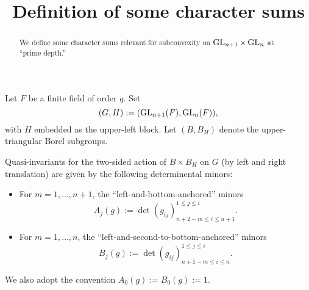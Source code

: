 \documentclass[reqno]{amsart} 
\begin{document}
\title{Definition of some character sums}

\begin{abstract}
  We define some character sums relevant for subconvexity on $\operatorname{GL}_{n+1} \times \operatorname{GL}_n$ at ``prime depth.''
\end{abstract}

\maketitle

Let $F$ be a finite field of order $q$.  Set
\begin{equation*}
  (G,H) := (\operatorname{GL}_{n+1}(F), \operatorname{GL}_n(F)),
\end{equation*}
with $H$ embedded as the upper-left block.  Let $(B, B_H)$ denote the upper-triangular Borel subgroups.

Quasi-invariants for the two-sided action of $B \times B_H$ on $G$ (by left and right translation) are given by the following determinental minors:
\begin{itemize}
\item For $m = 1, \dotsc, n+1$, the ``left-and-bottom-anchored'' minors
  \begin{equation*}
    A_j(g) := \det
    (g_{i j}    )_{
      n+2-m \leq i \leq n+1
    }^{1 \leq j \leq i}.
  \end{equation*}
\item For $m = 1, \dotsc, n$, the ``left-and-second-to-bottom-anchored'' minors
  \begin{equation*}
    B_j(g) := \det
    (g_{i j}    )_{
      n+1-m \leq i \leq n
    }^{1 \leq j \leq i}.
  \end{equation*}
\end{itemize}
We also adopt the convention $A_0(g) := B_0(g) := 1$.
\end{document}
